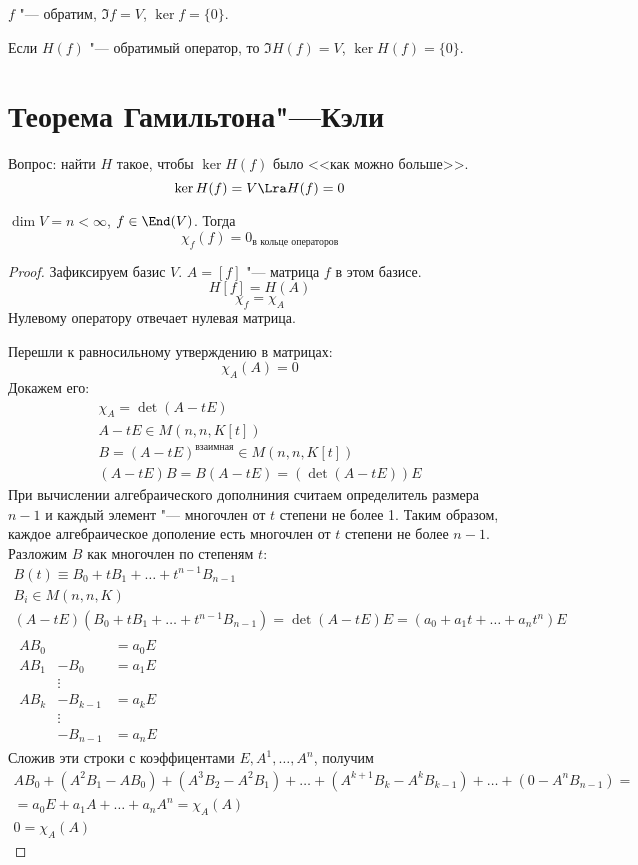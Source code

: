 \begin{Rem}
	$f$ "--- обратим, $\Im f = V$, $\ker f = \{0\}$.

	Если $H(f)$ "--- обратимый оператор, то $\Im H(f) = V$, $\ker H(f) = \{0\}$.
\end{Rem}

\section{Теорема Гамильтона"---Кэли}

Вопрос: найти $H$ такое, чтобы $\ker H(f)$ было <<как можно больше>>.
\[ \ker H(f) = V \Lra H(f) = 0 \]
\begin{theorem}
	$\dim V = n < \infty$, $f \in \End(V)$.
	Тогда
	\[ \chi_f(f) = 0_{\text{в кольце операторов}} \]
\end{theorem}
\begin{proof}
	Зафиксируем базис $V$.
	$A = [f]$ "--- матрица $f$ в этом базисе.
	\[ H[f] = H(A) \]
	\[ \chi_f = \chi_A \]
	Нулевому оператору отвечает нулевая матрица.
	
	Перешли к равносильному утверждению в матрицах:
	\[ \chi_A (A) = 0 \]
	Докажем его:
	\begin{gather*}
		\chi_A = \det (A - tE) \\
		A - tE \in M(n, n, K[t]) \\
		B = (A - tE)^{\text{взаимная}} \in M(n, n, K[t]) \\
		(A - tE) B = B(A - tE) = (\det (A - tE)) E
	\end{gather*}
	При вычислении алгебраического дополниния считаем определитель размера $n - 1$ и каждый элемент "--- многочлен от $t$ степени не более 1.
	Таким образом, каждое алгебраическое дополение есть многочлен от $t$ степени не более $n - 1$.
	Разложим $B$ как многочлен по степеням $t$:
	\begin{gather*}
		B(t) \equiv B_0 + t B_1 + \dots + t^{n-1} B_{n-1} \\
		B_i \in M(n, n, K) \\
		(A - tE)(B_0 + t B_1 + \dots + t^{n-1} B_{n-1}) = \det (A - tE) E = (a_0 + a_1 t + \dots + a_n t^n) E \\
		\begin{alignedat}{3}
			AB_0 &      &= a_0 E \\
			AB_1 &- B_0 &= a_1 E \\
			&\vdots \\
			AB_k &- B_{k-1} &= a_k E \\
			&\vdots \\
			     &- B_{n-1} &= a_n E
		\end{alignedat}
	\end{gather*}
	Сложив эти строки с коэффицентами $E, A^1, \dots, A^n$, получим
	\begin{gather*}
		AB_0 + (A^2 B_1 - AB_0) + (A^3 B_2 - A^2B_1) + \dots + (A^{k+1} B_k - A^kB_{k-1}) + \dots + (0 - A^nB_{n-1}) = \\
		= a_0 E + a_1 A + \dots + a_n A^n = \chi_A(A) \\
		0 = \chi_A(A)
	\end{gather*}
\end{proof}

